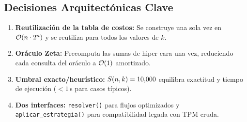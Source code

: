 \subsection{Decisiones Arquitectónicas Clave}

\begin{enumerate}[label=\textbf{\arabic*.}]
    \item \textbf{Reutilización de la tabla de costos:} Se construye una sola vez en $\mathcal{O}(n \cdot 2^n)$ y se reutiliza para todos los valores de $k$.
    \item \textbf{Oráculo Zeta:} Precomputa las sumas de hiper-cara una vez, reduciendo cada consulta del oráculo a $\mathcal{O}(1)$ amortizado.
    \item \textbf{Umbral exacto/heurístico:} $S(n,k) = 10{,}000$ equilibra exactitud y tiempo de ejecución ($< 1\,$s para casos típicos).
    \item \textbf{Dos interfaces:} \texttt{resolver()} para flujos optimizados y \texttt{aplicar\_estrategia()} para compatibilidad legada con TPM cruda.
\end{enumerate}
